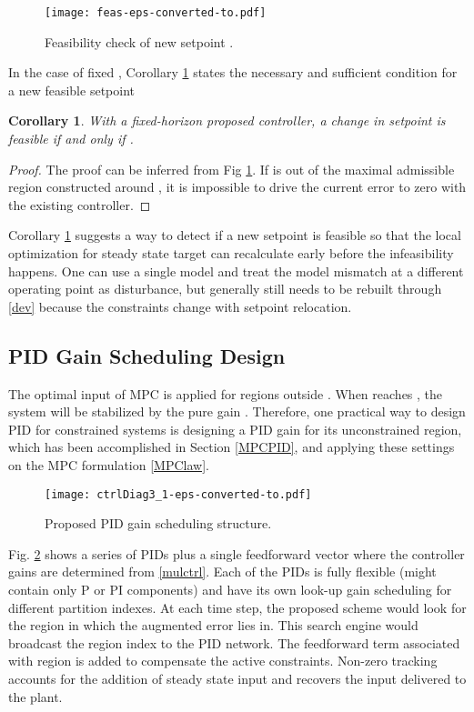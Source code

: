 \documentclass[5p,authoryear,times]{elsarticle}
\newtheorem{corollary}[thm]{Corollary}
\begin{document}
\begin{figure}[!t]
\centering
\texttt{[image: feas-eps-converted-to.pdf]}
\caption{Feasibility check of new setpoint .}
\label{feas}
\end{figure}

In the case of fixed , Corollary \ref{reffsb} states the necessary and sufficient condition for a new feasible setpoint

\begin{corollary}\label{reffsb}
With a fixed-horizon proposed controller, a change in setpoint  is feasible if and only if .
\end{corollary}
\begin{proof}
The proof can be inferred from Fig \ref{feas}. If  is out of the maximal admissible region  constructed around , it is impossible to drive the current error  to zero with the existing controller.
\end{proof}

Corollary \ref{reffsb} suggests a way to detect if a new setpoint is feasible so that the local optimization for steady state target can recalculate  early before the infeasibility happens. One can use a single model and treat the model mismatch at a different operating point as disturbance, but generally  still needs to be rebuilt through \eqref{dev} because the constraints change with setpoint relocation.



\subsection{PID Gain Scheduling Design}
The optimal input of MPC is applied for regions outside . When  reaches , the system will be stabilized by the pure gain . Therefore, one practical way to design PID for constrained systems is designing a PID gain for its unconstrained region, which has been accomplished in Section \ref{MPCPID}, and applying these settings on the MPC formulation \eqref{MPClaw}.

\begin{figure}[t]
\centering
\texttt{[image: ctrlDiag3\_1-eps-converted-to.pdf]}
\caption{Proposed PID gain scheduling structure.}
\label{ctrlDiag3}
\end{figure}

Fig. \ref{ctrlDiag3} shows a series of PIDs plus a single feedforward vector where the controller gains are determined from \eqref{mulctrl}. Each of the PIDs is fully flexible (might contain only P or PI components) and have its own look-up gain scheduling for different partition indexes. At each time step, the proposed scheme would look for the region in which the augmented error  lies in. This search engine would broadcast the region index  to the PID network. The feedforward term associated with region  is added to compensate the active constraints. Non-zero tracking accounts for the addition of steady state input and recovers the input delivered to the plant.
\end{document}
